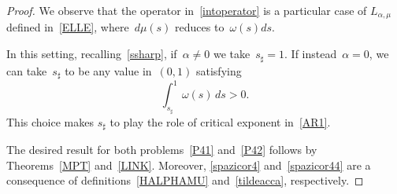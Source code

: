 \documentclass[12pt,a4paper,intlimits,sumlimits]{amsart}
\theoremstyle{definition}
\theoremstyle{plain}
\numberwithin{equation}{section}
\begin{document}
\begin{proof}
We observe that the operator in~\eqref{intoperator} is a particular case of $L_{\alpha, \mu}$ defined in~\eqref{ELLE}, where~$d\mu(s)$ reduces to~$\omega(s)ds$.

In this setting, recalling~\eqref{ssharp}, if~$\alpha\neq0$ we take~$s_\sharp=1$.
If instead~$\alpha=0$, we can take~$s_\sharp$ to be any value in~$(0, 1)$ satisfying
\[
\int_{s_\sharp}^1 \omega(s) \, ds >0.
\]
This choice makes $s_\sharp$ to play the role of critical exponent in~\eqref{AR1}.

The desired result for both problems~\eqref{P41} and~\eqref{P42} follows by Theorems~\ref{MPT} and~\ref{LINK}.
Moreover, \eqref{spazicor4} and~\eqref{spazicor44} are a consequence of definitions~\eqref{HALPHAMU} and~\eqref{tildeacca}, respectively. 
\end{proof}
\end{document}
